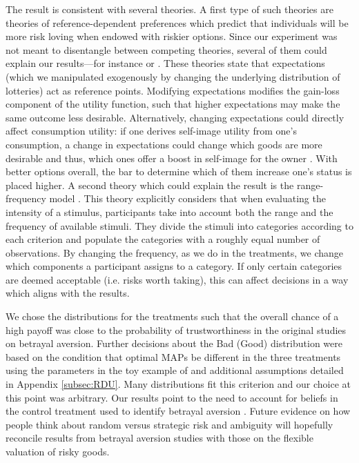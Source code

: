 \documentclass[pdftex,12pt, a4paper]{article}
\begin{document}
The result is consistent with several theories.
A first type of such theories are theories of reference-dependent preferences which predict that individuals will be more risk loving when endowed with riskier options.
Since our experiment was not meant to disentangle between competing theories, several of them could explain our results---for instance \cite{Koszegi2006,Koszegi2007} or \cite{Wenner2015}.
These theories state that expectations (which we manipulated exogenously by changing the underlying distribution of lotteries) act as reference points.
Modifying expectations modifies the gain-loss component of the utility function, such that higher expectations may make the same outcome less desirable.
Alternatively, changing expectations could directly affect consumption utility: if one derives self-image utility from one's consumption, a change in expectations could change which goods are more desirable and thus, which ones offer a boost in self-image for the owner \citep{Strahilevitz1998,Marzilli2011}.
With better options overall, the bar to determine which of them increase one's status is placed higher.
A second theory which could explain the result is the range-frequency model \citep{Parducci1965,Parducci1971}.
This theory explicitly considers that when evaluating the intensity of a stimulus, participants take into account both the range and the frequency of available stimuli. They divide the stimuli into categories according to each criterion and populate the categories with a roughly equal number of observations. By changing the frequency, as we do in the treatments, we change which components a participant assigns to a category. If only certain categories are deemed acceptable (i.e. risks worth taking), this can affect decisions in a way which aligns with the results.

We chose the distributions for the treatments such that the overall chance of a high payoff was close to the probability of trustworthiness in the original studies on betrayal aversion.
Further decisions about the Bad (Good) distribution were based on the condition that optimal MAPs be different in the three treatments using the parameters in the toy example of \cite{Li2020a} and additional assumptions detailed in Appendix \ref{subsec:RDU}.
Many distributions fit this criterion and our choice at this point was arbitrary.
Our results point to the need to account for beliefs in the control treatment used to identify betrayal aversion \citep[the Risky Dictator Game in][]{Bohnet2004}.
Future evidence on how people think about random versus strategic risk and ambiguity will hopefully reconcile results from betrayal aversion studies with those on the flexible valuation of risky goods.
\end{document}
